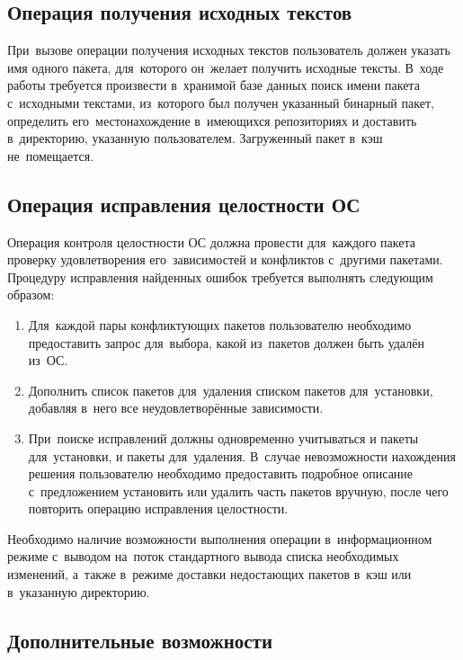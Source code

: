 \subsection{Операция получения исходных текстов}

При~вызове операции получения исходных текстов пользователь должен указать имя одного пакета,
для~которого он~желает получить исходные тексты.
В~ходе работы требуется произвести в~хранимой базе данных   поиск имени пакета с~исходными текстами,
из~которого был получен указанный бинарный пакет, 
определить его~местонахождение в~имеющихся репозиториях и доставить в~директорию, указанную пользователем.
Загруженный пакет в~кэш не~помещается.

\subsection{Операция исправления целостности ОС}

Операция контроля целостности ОС должна провести для~каждого пакета  проверку удовлетворения его~зависимостей и конфликтов с~другими пакетами.
Процедуру исправления найденных ошибок требуется выполнять следующим образом:

\begin{enumerate}

\item {
Для~каждой пары конфликтующих пакетов пользователю необходимо предоставить запрос для~выбора, 
какой из~пакетов должен быть удалён из~ОС.
}

\item {
Дополнить список пакетов для~удаления списком пакетов для~установки,
добавляя в~него все неудовлетворённые зависимости.
}

\item {
При~поиске исправлений должны одновременно учитываться и пакеты для~установки, и пакеты для~удаления.
В~случае невозможности нахождения решения пользователю необходимо предоставить подробное описание с~предложением установить или удалить часть пакетов вручную,
после чего повторить операцию исправления целостности.
}

\end{enumerate}

Необходимо наличие возможности выполнения операции в~информационном режиме с~выводом на~поток  стандартного вывода списка необходимых изменений,
а~также в~режиме доставки недостающих пакетов в~кэш или в~указанную директорию.

\subsection{Дополнительные возможности}
\label{advfeatures}

